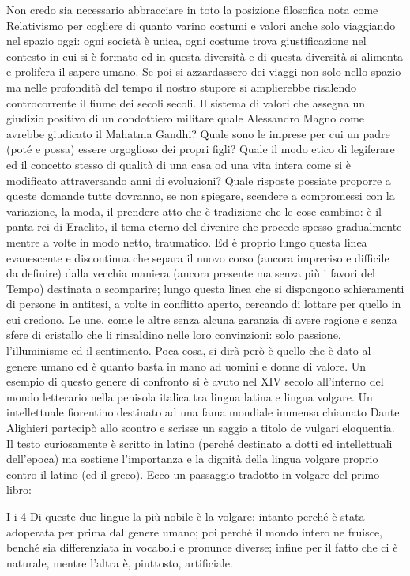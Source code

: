 Non credo sia necessario abbracciare in toto la posizione filosofica nota come Relativismo per cogliere di quanto varino costumi e valori anche solo viaggiando nel spazio oggi: ogni società è unica, ogni costume trova giustificazione nel contesto in cui si è formato ed in questa diversità e di questa diversità  si alimenta e prolifera il sapere umano. Se poi si azzardassero dei viaggi non solo nello spazio ma nelle profondità del tempo il nostro stupore si amplierebbe risalendo controcorrente il fiume dei secoli secoli. Il sistema di valori che assegna un  giudizio positivo di un condottiero militare quale Alessandro Magno come avrebbe giudicato il Mahatma Gandhi? Quale sono le imprese per cui un padre (poté e possa) essere orgoglioso dei propri figli? Quale il modo  etico di legiferare ed il concetto stesso di qualità di una casa od una vita intera come si è modificato attraversando anni di evoluzioni? Quale risposte possiate proporre a queste domande tutte dovranno, se non spiegare, scendere a compromessi con la variazione, la moda, il prendere atto che è tradizione che le cose cambino: è il panta rei di Eraclito, il tema eterno del divenire che procede spesso gradualmente mentre a volte in modo netto, traumatico. Ed è proprio lungo questa linea evanescente e discontinua che separa il nuovo corso (ancora impreciso e difficile da definire) dalla vecchia maniera (ancora presente ma senza più i favori del Tempo)  destinata a scomparire;  lungo questa linea che si dispongono schieramenti di persone in antitesi, a volte in conflitto aperto, cercando di lottare per quello in cui credono. Le une, come le altre senza alcuna garanzia di avere ragione e senza sfere di cristallo che li rinsaldino nelle loro convinzioni: solo passione, l'illuminisme ed il sentimento. Poca cosa, si dirà però è quello che è dato al genere umano ed è quanto basta in mano ad uomini e donne di valore.
Un esempio di questo genere di confronto si è avuto nel XIV secolo all'interno del mondo letterario nella penisola italica tra lingua latina e lingua volgare. Un intellettuale fiorentino destinato ad una fama mondiale immensa chiamato Dante Alighieri partecipò allo scontro e scrisse un saggio a titolo de vulgari eloquentia. Il testo curiosamente è scritto in latino (perché destinato a dotti ed intellettuali dell'epoca) ma sostiene l'importanza e la dignità della lingua volgare proprio contro il latino (ed il greco). Ecco un passaggio tradotto in volgare del primo libro:

I-i-4 Di queste due lingue la più nobile è la volgare: intanto perché è stata adoperata per prima dal genere umano; poi perché il mondo intero ne fruisce, benché sia differenziata in vocaboli e pronunce diverse; infine per il fatto che ci è naturale, mentre l'altra è, piuttosto, artificiale. 

